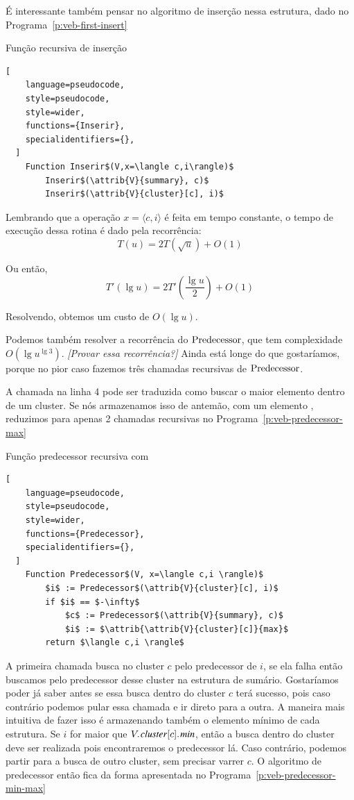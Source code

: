 É interessante também pensar no algoritmo de inserção nessa estrutura, dado no
Programa~\ref{p:veb-first-insert}

\begin{programruledcaption}{Função recursiva de inserção \label{p:veb-first-insert}}
  \begin{lstlisting}[
    language=pseudocode,
    style=pseudocode,
    style=wider,
    functions={Inserir},
    specialidentifiers={},
  ]
    Function Inserir$(V,x=\langle c,i\rangle)$
        Inserir$(\attrib{V}{summary}, c)$
        Inserir$(\attrib{V}{cluster}[c], i)$
  \end{lstlisting}
\end{programruledcaption}

Lembrando que a operação $x=\langle c, i \rangle$ é feita em tempo constante, o
tempo de execução dessa rotina é dado pela recorrência:
\[
T(u) = 2T(\sqrt{u}) + O(1)
\]

Ou então,
\[
T'(\lg u) = 2T'\left (\frac{\lg u}{2}\right ) + O(1)
\]

Resolvendo, obtemos um custo de $O(\lg u)$.

Podemos também resolver a recorrência do $\operatorname{Predecessor}$, que tem complexidade
$O(\lg u^{\lg 3})$. \textit{[Provar essa recorrência?]} Ainda está longe do que
gostaríamos, porque no pior caso fazemos três chamadas recursivas de
$\operatorname{Predecessor}$.

A chamada na linha 4 pode ser traduzida como buscar o maior elemento dentro de
um cluster. Se nós armazenamos isso de antemão, com um elemento ,
reduzimos para apenas 2 chamadas recursivas no
Programa~\ref{p:veb-predecessor-max}

\begin{programruledcaption}{Função predecessor recursiva com  \label{p:veb-predecessor-max}}
  \begin{lstlisting}[
    language=pseudocode,
    style=pseudocode,
    style=wider,
    functions={Predecessor},
    specialidentifiers={},
  ]
    Function Predecessor$(V, x=\langle c,i \rangle)$
        $i$ := Predecessor$(\attrib{V}{cluster}[c], i)$
        if $i$ == $-\infty$
            $c$ := Predecessor$(\attrib{V}{summary}, c)$
            $i$ := $\attrib{\attrib{V}{cluster}[c]}{max}$
        return $\langle c,i \rangle$
  \end{lstlisting}
\end{programruledcaption}

A primeira chamada busca no cluster $c$ pelo predecessor de $i$, se ela falha
então buscamos pelo predecessor desse cluster na estrutura de sumário.
Gostaríamos poder já saber antes se essa busca dentro do cluster $c$ terá
sucesso, pois caso contrário podemos pular essa chamada e ir direto para a
outra. A maneira mais intuitiva de fazer isso é armazenando também o elemento
mínimo de cada estrutura. Se $i$ for maior que
$\attrib{\attrib{V}{cluster}[c]}{min}$, então a busca dentro do cluster deve ser
realizada pois encontraremos o predecessor lá. Caso contrário, podemos partir
para a busca de outro cluster, sem precisar varrer $c$. O algoritmo de
predecessor então fica da forma apresentada no
Programa~\ref{p:veb-predecessor-min-max}

